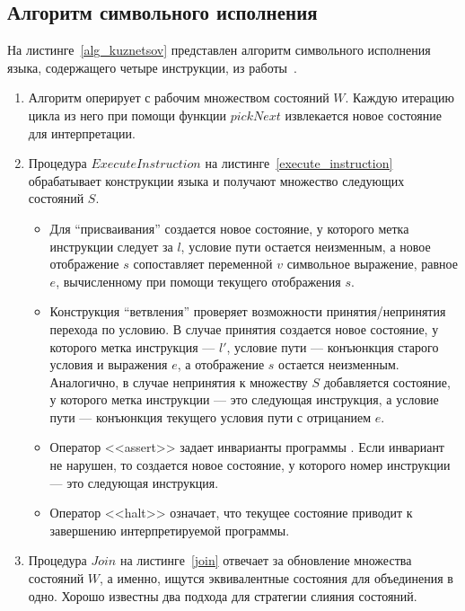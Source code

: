 \subsection{Алгоритм символьного исполнения}
На листинге~\ref{alg_kuznetsov} представлен алгоритм символьного исполнения языка, содержащего четыре инструкции, из работы~\cite{kuznetsov2012efficient}.
\begin{enumerate}
    \item Алгоритм оперирует с рабочим множеством состояний $W$. Каждую итерацию цикла  из него при помощи функции $pickNext$ извлекается новое состояние для интерпретации.
    \item Процедура $ExecuteInstruction$ на листинге~\ref{execute_instruction} обрабатывает конструкции языка и получают множество следующих состояний $S$.
        \begin{itemize}
            \item Для ``присваивания'' создается новое состояние, у которого метка инструкции следует за $l$, условие пути остается неизменным, а новое отображение $s$ 
            сопоставляет переменной $v$ символьное выражение, равное $e$, вычисленному при помощи текущего отображения $s$.
            \item Конструкция ``ветвления'' проверяет возможности принятия/непринятия перехода по условию. В случае принятия создается новое состояние, у которого метка инструкция --- $l'$, условие пути --- конъюнкция старого условия и выражения $e$, а отображение $s$ остается неизменным. Аналогично, в случае непринятия к множеству $S$ добавляется состояние, у которого метка инструкции --- это следующая инструкция, а условие пути --- конъюнкция текущего условия пути с отрицанием $e$.
            \item Оператор <<assert>> задает инварианты программы . Если инвариант не нарушен, то создается новое состояние, у которого номер инструкции --- это следующая инструкция.
            \item Оператор <<halt>> означает, что текущее состояние приводит к завершению интерпретируемой программы.
        \end{itemize}
    \item Процедура $Join$ на листинге~\ref{join} отвечает за обновление множества состояний $W$, а именно, ищутся эквивалентные состояния для объединения в одно. Хорошо известны два подхода для стратегии слияния состояний. 

\end{enumerate}
